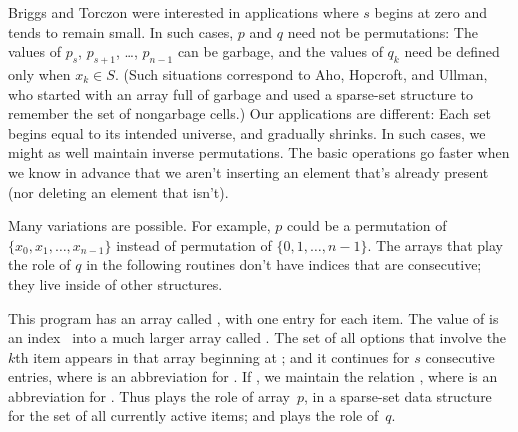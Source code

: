 Briggs and Torczon were interested in applications where $s$ begins at
zero and tends to remain small. In such cases, $p$ and $q$ need not
be permutations: The values of $p_s$, $p_{s+1}$, \dots, $p_{n-1}$ can
be garbage, and the values of $q_k$ need be defined only when $x_k\in S$.
(Such situations correspond to Aho, Hopcroft, and Ullman, who started
with an array full of garbage and used a sparse-set structure to remember
the set of nongarbage cells.) Our applications are different: Each set
begins equal to its intended universe, and gradually shrinks. In such
cases, we might as well maintain inverse permutations.
The basic operations go faster when we know in advance that we
aren't inserting an element that's already present (nor deleting an element
that isn't).

Many variations are possible. For example, $p$ could be a permutation
of $\{x_0,x_1,\ldots,x_{n-1}\}$ instead of permutation of
$\{0,1,\ldots,n-1\}$. The arrays that play the role of $q$
in the following routines don't have indices that are consecutive;
they live inside of other structures.

\fi

This program has an
array called , with one entry for each item. The value of 
is an index~ into a much larger array called . The set of
all
options that involve the $k$th item appears in that array beginning
at ; and it continues for $s$ consecutive entries, where 
is an abbreviation for . If ,
we maintain the
relation , where  is an abbreviation
for
. Thus  plays the role of array~$p$, in a
sparse-set data structure for the set of all currently active items;
and  plays the role of~$q$.

